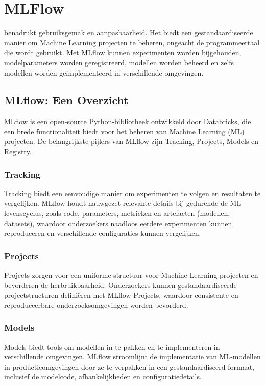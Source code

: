 \section{MLFlow}

\textcite{MLflow2023} benadrukt gebruiksgemak en aanpasbaarheid. Het biedt een gestandaardiseerde manier om Machine Learning projecten te beheren, ongeacht de programmeertaal die wordt gebruikt. Met MLflow kunnen experimenten worden bijgehouden, modelparameters worden geregistreerd, modellen worden beheerd en zelfs modellen worden geïmplementeerd in verschillende omgevingen.

\subsection{MLflow: Een Overzicht}

MLflow is een open-source Python-bibliotheek ontwikkeld door Databricks, die een brede functionaliteit biedt voor het beheren van Machine Learning (ML) projecten. De belangrijkste pijlers van MLflow zijn Tracking, Projects, Models en Registry.

\subsubsection{Tracking}
Tracking biedt een eenvoudige manier om experimenten te volgen en resultaten te vergelijken. MLflow houdt nauwgezet relevante details bij gedurende de ML-levenscyclus, zoals code, parameters, metrieken en artefacten (modellen, datasets), waardoor onderzoekers naadloos eerdere experimenten kunnen reproduceren en verschillende configuraties kunnen vergelijken.

\subsubsection{Projects}
Projects zorgen voor een uniforme structuur voor Machine Learning projecten en bevorderen de herbruikbaarheid. Onderzoekers kunnen gestandaardiseerde projectstructuren definiëren met MLflow Projects, waardoor consistente en reproduceerbare onderzoeksomgevingen worden bevorderd.

\subsubsection{Models}
Models biedt tools om modellen in te pakken en te implementeren in verschillende omgevingen. MLflow stroomlijnt de implementatie van ML-modellen in productieomgevingen door ze te verpakken in een gestandaardiseerd formaat, inclusief de modelcode, afhankelijkheden en configuratiedetails.

